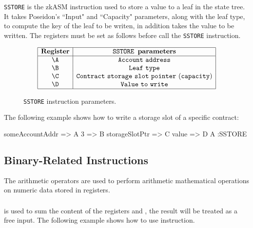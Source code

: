 \texttt{SSTORE} is the zkASM instruction used to store a value to a leaf in the state tree. It takes Poseidon's ``Input" and ``Capacity" parameters, along with the leaf type, to compute the key of the leaf to be writen, in addition takes the value to be written. The registers must be set as follows before call the \texttt{SSTORE} instruction.

\begin{figure}[h!]
    \renewcommand{\figurename}{Table}
    \[
    \begin{array}{|c|c|}
        \hline
        \mathbf{Register} &\texttt{SSTORE } \textbf{parameters} \\ \hline
        \A & \mathtt{Account~address} \\
        \B & \mathtt{Leaf~type} \\
        \C & \mathtt{Contract~storage~slot~pointer~(capacity)} \\
        \D & \mathtt{Value~to~write} \\
        \hline
    \end{array}
    \]
    \caption{\texttt{SSTORE} instruction parameters.}
    \label{tab:memory-first-example}
\end{figure}

The following example shows how to write a storage slot of a specific contract:

\begin{zkasm}
someAccountAddr => A          
3 => B      
storageSlotPtr => C          
value => D         
A               :SSTORE
\end{zkasm}





\subsection{Binary-Related Instructions}

The arithmetic operators are used to perform arithmetic mathematical operations on numeric data stored in registers.

\subsubsection{\ADD}

\ADD is used to sum the content of the registers \A and \B, the result will be treated as a free input. The following example shows how to use \ADD instruction.

